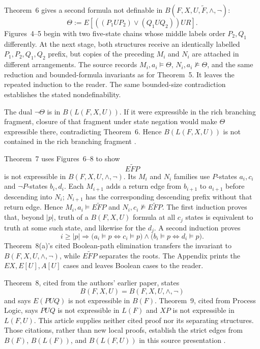 Theorem~6 gives a second formula not definable in
\(B(F,X,U,\widetilde F,\land,\neg)\):
\[
 \Theta:=
 E[((P_1UP_2)\lor(Q_1UQ_2))UR].
\]
Figures~4--5 begin with two five-state chains whose middle labels order
\(P_2,Q_1\) differently.  At the next stage, both structures receive an
identically labelled \(P_1,P_2,Q_1,Q_2\) prefix, but copies of the preceding
\(M_i\) and \(N_i\) are attached in different arrangements.  The source
records \(M_i,a_i\models\Theta\), \(N_i,a_i\not\models\Theta\), and the same
reduction and bounded-formula invariants as for Theorem~5.  It leaves the
repeated induction to the reader.  The same bounded-size contradiction
establishes the stated nondefinability.

The dual
\(\neg\Theta\) is in \(B(L(F,X,U))\).  If it were expressible in the rich
branching fragment, closure of that fragment under state negation would make
\(\Theta\) expressible there, contradicting Theorem~6.  Hence
\(B(L(F,X,U))\) is not contained in the rich branching fragment
\cite[Theorems~5--6, pp.~161--163, 169--171]{EmersonHalpern1986}.

Theorem~7 uses Figures~6--8 to show
\[
 E\widetilde FP
\]
is not expressible in \(B(F,X,U,\land,\neg)\).  Its \(M_i\) and \(N_i\)
families use \(P\)-states \(a_i,c_i\) and \(\neg P\)-states \(b_i,d_i\).
Each \(M_{i+1}\) adds a return edge from \(b_{i+1}\) to \(a_{i+1}\) before
descending into \(N_i\); \(N_{i+1}\) has the corresponding descending
prefix without that return edge.  Hence
\(M_i,a_i\models E\widetilde FP\) and
\(N_i,c_i\not\models E\widetilde FP\).  The first induction proves that,
beyond \(|p|\), truth of a \(B(F,X,U)\) formula at all \(c_j\) states is
equivalent to truth at some such state, and likewise for the \(d_j\).  A
second induction proves
\[
 i\geq|p|\Rightarrow
 \bigl(a_i\models p\Longleftrightarrow c_i\models p\bigr)
 \land
 \bigl(b_i\models p\Longleftrightarrow d_i\models p\bigr).
\]
Theorem~8(a)'s cited Boolean-path elimination transfers the invariant to
\(B(F,X,U,\land,\neg)\), while \(E\widetilde FP\) separates the roots.
The Appendix prints the \(EX,E[U],A[U]\) cases and leaves Boolean cases to
the reader.

Theorem~8, cited from the authors' earlier paper, states
\[
 B(F,X,U)=B(F,X,U,\land,\neg)
\]
and says \(E(PUQ)\) is not expressible in \(B(F)\).  Theorem~9, cited from
Process Logic, says \(PUQ\) is not expressible in \(L(F)\) and \(XP\) is
not expressible in \(L(F,U)\).  This article supplies neither cited proof
nor its separating structures.  Those citations, rather than new local
proofs, establish the strict edges from \(B(F)\), \(B(L(F))\), and
\(B(L(F,U))\) in this source presentation
\cite[pp.~161--175]{EmersonHalpern1986}.

